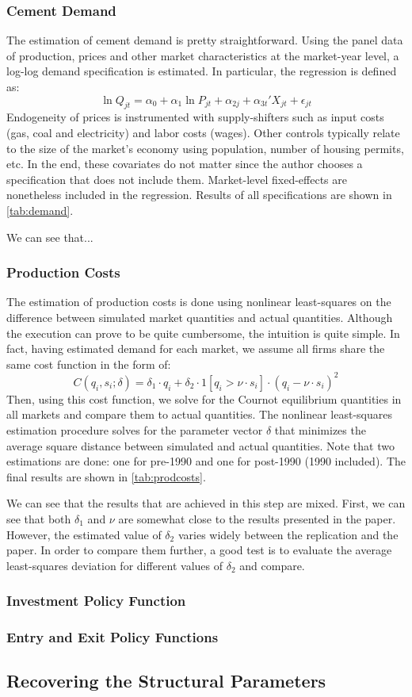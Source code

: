 \documentclass[12pt]{article}
\begin{document}
\subsubsection{Cement Demand}

The estimation of cement demand is pretty straightforward. Using the panel data of production, prices and other market characteristics at the market-year level, a log-log demand specification is estimated. In particular, the regression is defined as: $$\ln Q_{jt} = \alpha_0 + \alpha_1\ln P_{jt} + \alpha_{2j} + \alpha_{3t}'X_{jt} + \epsilon_{jt} $$
Endogeneity of prices is instrumented with supply-shifters such as input costs (gas, coal and electricity) and labor costs (wages). Other controls typically relate to the size of the market's economy using population, number of housing permits, etc. In the end, these covariates do not matter since the author chooses a specification that does not include them. Market-level fixed-effects are nonetheless included in the regression. Results of all specifications are shown in \ref{tab:demand}.



We can see that...

\subsubsection{Production Costs}

The estimation of production costs is done using nonlinear least-squares on the difference between simulated market quantities and actual quantities. Although the execution can prove to be quite cumbersome, the intuition is quite simple. In fact, having estimated demand for each market, we assume all firms share the same cost function in the form of: $$C(q_i, s_i; \delta) = \delta_1 \cdot q_i + \delta_2 \cdot 1[q_i > \nu\cdot s_i] \cdot (q_i - \nu\cdot s_i)^2 $$
Then, using this cost function, we solve for the Cournot equilibrium quantities in all markets and compare them to actual quantities. The nonlinear least-squares estimation procedure solves for the parameter vector $\delta$ that minimizes the average square distance between simulated and actual quantities. Note that two estimations are done: one for pre-1990 and one for post-1990 (1990 included). The final results are shown in \ref{tab:prodcosts}.



We can see that the results that are achieved in this step are mixed. First, we can see that both $\delta_1$ and $\nu$ are somewhat close to the results presented in the paper. However, the estimated value of $\delta_2$ varies widely between the replication and the paper. In order to compare them further, a good test is to evaluate the average least-squares deviation for different values of $\delta_2$ and compare.

\subsubsection{Investment Policy Function}



\subsubsection{Entry and Exit Policy Functions}



\subsection{Recovering the Structural Parameters}
\end{document}
